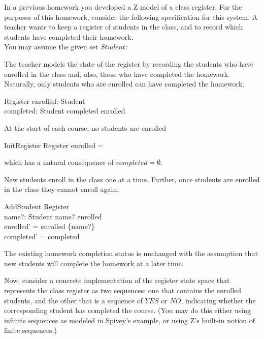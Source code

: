 \documentclass{article}
\begin{document}


In a previous homework you developed a Z model of a class
register. For the purposes of this homework, consider the following specification for this system:
A teacher wants to keep a register of students in the class, and to record which students have completed their homework. \\[2ex]
You may assume the given set $\mathit{Student}$:
\begin{zed}
[Student]
\end{zed}

The teacher models the state of the register by recording the
students who have enrolled in the class and, also, those who have
completed the homework. Naturally, only students who are enrolled
can have completed the homework.
\begin{schema}{Register}
    enrolled: \power Student\\
    completed: \power Student
\where
    completed \subseteq enrolled
\end{schema}

At the start of each course, no students are enrolled
\begin{schema}{InitRegister}
    Register
\where
    enrolled = \emptyset
\end{schema}
which has a natural consequence of $completed = \emptyset$.

New students enroll in the class one at a time. Further, once
students are enrolled in the class they cannot enroll again.
\begin{schema}{AddStudent}
    \Delta Register \\
    name?: Student
\where
    name? \notin enrolled \\
    enrolled' = enrolled \cup \{name?\} \\
    completed' = completed
\end{schema}
The existing homework completion status is unchanged with the
assumption that new students will complete the homework at a later
time.

Now, consider a concrete implementation of the register state
space that represents the class register as two sequences: one
that contains the enrolled students, and the other that is a
sequence of $YES$ or $NO$, indicating whether the corresponding
student has completed the course. (You may do this either using infinite sequences as modeled in Spivey's example, or using Z's built-in notion of finite sequences.)
\end{document}
